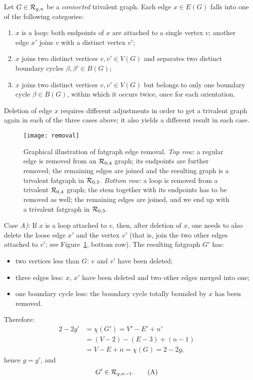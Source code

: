 Let $G \in \mathcal{R}_{g,n}$ be a \emph{connected} trivalent graph. Each edge
$x \in E(G)$ falls into one of the following categories:
\begin{enumerate}[\slshape A)]
\item $x$ is a loop: both endpoints of $x$ are
  attached to a single vertex $v$; another edge $x'$ joins $v$ with a
  distinct vertex $v'$;
\item $x$ joins two distinct vertices $v, v'
  \in V(G)$ and separates two distinct boundary cycles $\beta, \beta'
  \in B(G)$;
\item $x$ joins two distinct vertices $v, v'
  \in V(G)$ but belongs to only one boundary cycle $\beta \in B(G)$,
  within which it occurs twice, once for each orientation.
\end{enumerate}
Deletion of edge $x$ requires different adjustments in order to get a
trivalent graph again in each of the three cases above; it also yields
a different result in each case.
\begin{figure}
  \centering
  \texttt{[image: removal]}
  \caption{Graphical illustration of fatgraph edge removal.  \emph{Top row:} a regular edge is removed from an $\mathcal{R}_{0,4}$ graph; its endpoints are further removed; the remaining edges are joined and the resulting graph is a trivalent fatgraph in $\mathcal{R}_{0,3}$.  \emph{Bottom row:} a loop is removed from a trivalent $\mathcal{R}_{0,4}$ graph; the stem together with its endpoints has to be removed as well; the remaining edges are joined, and we end up with a trivalent fatgraph in $\mathcal{R}_{0,3}$.}
  \label{fig:removal}
\end{figure}

Case {\slshape A)}: If $x$ is a loop attached to $v$, then, after deletion
of $x$, one needs to also delete the loose edge $x'$ and the
vertex $v'$ (that is, join the two other edges attached to $v'$; see
Figure~\ref{fig:removal}, bottom row).  The resulting fatgraph $G'$ has:
\begin{itemize}
\item two vertices less than $G$: $v$ and $v'$ have been deleted;
\item three edges less: $x$, $x'$ have been deleted and two other
  edges merged into one;
\item one boundary cycle less: the boundary cycle totally bounded by
  $x$ has been removed.
\end{itemize}
Therefore:
\begin{align*}
  2 - 2g' &= \chi(G') = V' - E' + n' 
  \\
  &= (V-2) -(E-3) + (n-1)
  \\
  &= V - E + n = \chi(G) = 2 - 2g,
\end{align*}
hence $g=g'$, and 
\begin{equation}
G' \in \mathcal{R}_{g,n-1}.
\label{eq:A}\tag{A}
\end{equation}

